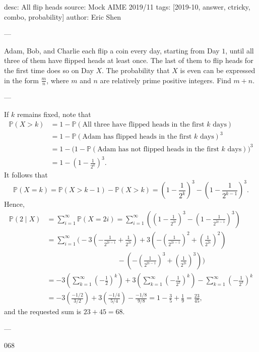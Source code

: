 desc: All flip heads
source: Mock AIME 2019/11
tags: [2019-10, answer, ctricky, combo, probability]
author: Eric Shen

---

Adam, Bob, and Charlie each flip a coin every day, starting from Day $1$, until all three of them have flipped heads at least once. The last of them to flip heads for the first time does so on Day $X$. The probability that $X$ is even can be expressed in the form $\tfrac mn$, where $m$ and $n$ are relatively prime positive integers. Find $m+n$.

---

If $k$ remains fixed, note that
\begin{align*}
    \mathbb P(X>k)&=1-\mathbb P(\text{All three have flipped heads in the first }k\text{ days})\\
    &=1-\mathbb P(\text{Adam has flipped heads in the first }k\text{ days})^3\\
    &=1-\big(1-\mathbb P(\text{Adam has not flipped heads in the first }k\text{ days})\big)^3\\
    &=1-\left(1-\frac1{2^k}\right)^3.
\end{align*}
It follows that \[\mathbb P(X=k)=\mathbb P(X>k-1)-\mathbb P(X>k)=\left(1-\frac1{2^k}\right)^3-\left(1-\frac1{2^{k-1}}\right)^3.\]
Hence,
\begin{align*}
    \mathbb P(2\mid X)&=\sum_{i=1}^\infty\mathbb P(X=2i)=\sum_{i=1}^\infty\left(\left(1-\frac1{2^{2i}}\right)^3-\left(1-\frac1{2^{2i-1}}\right)^3\right)\\
    &=\sum_{i=1}^\infty\Bigg(-3\left(-\frac1{2^{2i-1}}+\frac1{2^{2i}}\right)+3\left(-\left(\frac1{2^{2i-1}}\right)^2+\left(\frac1{2^{2i}}\right)^2\right)\\
    &\qquad\qquad\qquad\qquad\qquad-\left(-\left(\frac1{2^{2i-1}}\right)^3+\left(\frac1{2^{2i}}\right)^3\right)\Bigg)\\
    &=-3\left(\sum_{k=1}^\infty\left(-\frac12\right)^k\right)+3\left(\sum_{k=1}^\infty\left(-\frac1{2^2}\right)^k\right)-\sum_{k=1}^\infty\left(-\frac1{2^3}\right)^k\\
    &=-3\left(\frac{-1/2}{3/2}\right)+3\left(\frac{-1/4}{5/4}\right)-\frac{-1/8}{9/8}=1-\frac35+\frac19=\frac{23}{45},
\end{align*}
and the requested sum is $23+45=68$.

---

068
